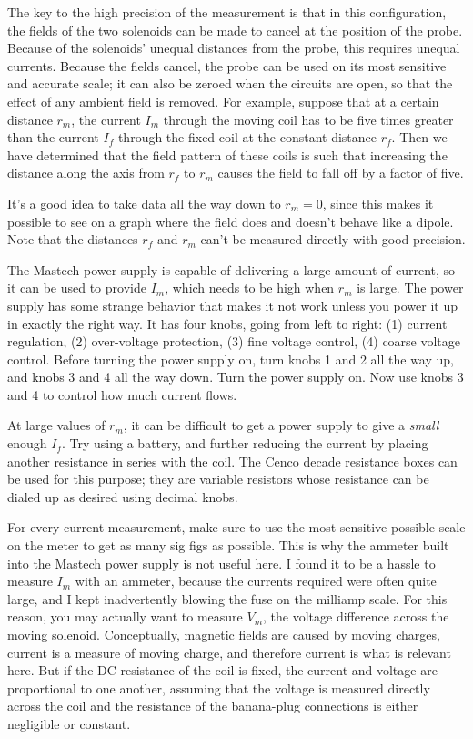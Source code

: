 The key to the high precision of the measurement is that in this configuration, the
fields of the two solenoids can be made to cancel at the position of the probe. Because
of the solenoids' unequal distances from the probe, this requires unequal currents.
Because the fields cancel, the probe can be used on its most sensitive and accurate
scale; it can also be zeroed when the circuits are open, so that the effect of any
ambient field is removed. For example, suppose that at a certain distance $r_m$,
the current $I_m$ through the moving coil has to be five times greater than the current
$I_f$ through the fixed coil at the constant distance $r_f$. Then we have determined that
the field pattern of these coils is such that increasing the distance along the axis
from $r_f$ to $r_m$ causes the field to fall off by a factor of five.

It's a good idea to take data all the way down to $r_m=0$, since this makes it possible
to see on a graph where the field does and doesn't behave like a dipole. Note that the
distances $r_f$ and $r_m$ can't be measured directly with good precision.

The Mastech power supply is capable of delivering a large amount of current, so it can
be used to provide $I_m$, which needs to be high when $r_m$ is large.
The power supply has some strange behavior that makes it not work unless
you power it up in exactly the right way. It has four knobs, going from
left to right: (1) current regulation, (2) over-voltage protection, (3)
fine voltage control, (4) coarse voltage control. Before turning the power
supply on, turn knobs 1 and 2 all the way up, and knobs 3 and 4 all the way
down. Turn the power supply on. Now use knobs 3 and 4 to control how much
current flows.

At large values of $r_m$, it can be difficult to get a power supply
to give a \emph{small} enough $I_f$. Try using a battery, and further reducing
the current by placing another resistance in series with the coil. The Cenco
decade resistance boxes can be used for this purpose; they are variable resistors
whose resistance can be dialed up as desired using decimal knobs.

For every current measurement, make sure to use the most sensitive possible scale
on the meter to get as many sig figs as possible. This is why the ammeter built into
the Mastech power supply is not useful here.
I found it to be a hassle to measure $I_m$ with an ammeter, because the currents
required were often quite large, and I kept inadvertently blowing the fuse on
the milliamp scale. For this reason, you may actually want to measure $V_m$, the
voltage difference across the moving solenoid. Conceptually, magnetic fields
are caused by moving charges, current is a measure of moving charge, and therefore
current is what is relevant here. But if the DC resistance of the coil is
fixed, the current and voltage are proportional to one another, assuming that the
voltage is measured directly across the coil and the resistance of the banana-plug
connections is either negligible or constant.

